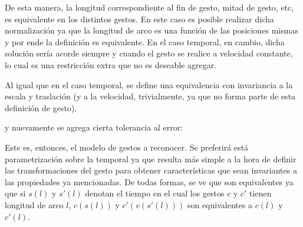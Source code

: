 De esta manera, la longitud correspondiente al fin de gesto, mitad de gesto, etc, es equivalente en los distintos gestos. En este caso es posible realizar dicha normalización ya que la longitud de arco es una función de las posiciones mismas y por ende la definición es equivalente. En el caso temporal, en cambio, dicha solución sería acorde siempre y cuando el gesto se realice a velocidad constante, lo cual es una restricción extra que no es deseable agregar.

Al igual que en el caso temporal, se define una equivalencia con invariancia a la escala y traslación (y a la velocidad, trivialmente, ya que no forma parte de esta definición de gesto). 


y nuevamente se agrega cierta tolerancia al error:


Este es, entonces, el modelo de gestos a reconocer. Se preferirá está parametrización sobre la temporal ya que resulta más simple a la hora de definir las transformaciones del gesto para obtener características que sean invariantes a las propiedades ya mencionadas. De todas formas, se ve que son equivalentes ya que si $s(l)$ y $s'(l)$ denotan el tiempo en el cual los gestos $c$ y $c'$ tienen longitud de arco $l$, $c(s(l))$ y $c'(v(s'(l)))$ son equivalentes a $c(l)$ y $c'(l)$.


